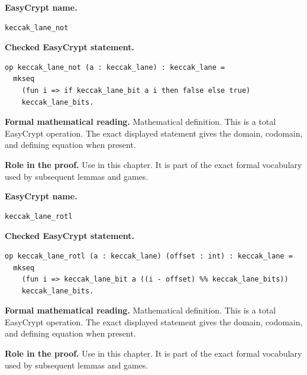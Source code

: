 \begin{formaldefinition}
\noindent\textbf{EasyCrypt name.}
\begin{lstlisting}[language=EasyCrypt,basicstyle=\ttfamily\scriptsize]
keccak_lane_not
\end{lstlisting}
\noindent\textbf{Checked EasyCrypt statement.}
\begin{lstlisting}[language=EasyCrypt,basicstyle=\ttfamily\scriptsize]
op keccak_lane_not (a : keccak_lane) : keccak_lane =
  mkseq
    (fun i => if keccak_lane_bit a i then false else true)
    keccak_lane_bits.
\end{lstlisting}
\noindent\textbf{Formal mathematical reading.}
Mathematical definition. This is a total EasyCrypt operation.  The exact displayed statement gives the domain, codomain, and defining equation when present.

\noindent\textbf{Role in the proof.}
Use in this chapter. It is part of the exact formal vocabulary used by subsequent lemmas and games.

\end{formaldefinition}

\begin{formaldefinition}
\noindent\textbf{EasyCrypt name.}
\begin{lstlisting}[language=EasyCrypt,basicstyle=\ttfamily\scriptsize]
keccak_lane_rotl
\end{lstlisting}
\noindent\textbf{Checked EasyCrypt statement.}
\begin{lstlisting}[language=EasyCrypt,basicstyle=\ttfamily\scriptsize]
op keccak_lane_rotl (a : keccak_lane) (offset : int) : keccak_lane =
  mkseq
    (fun i => keccak_lane_bit a ((i - offset) %% keccak_lane_bits))
    keccak_lane_bits.
\end{lstlisting}
\noindent\textbf{Formal mathematical reading.}
Mathematical definition. This is a total EasyCrypt operation.  The exact displayed statement gives the domain, codomain, and defining equation when present.

\noindent\textbf{Role in the proof.}
Use in this chapter. It is part of the exact formal vocabulary used by subsequent lemmas and games.

\end{formaldefinition}

